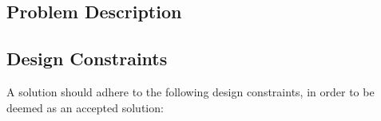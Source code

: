\documentclass[12pt]{article}
\begin{document}
\subsection{Problem Description}







\subsection{Design Constraints}
A solution should adhere to the following design constraints, in order to be deemed as an accepted solution:


\end{document}
